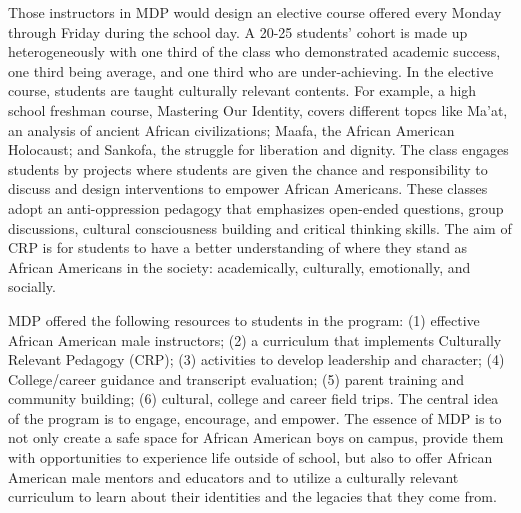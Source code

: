 Those instructors in MDP would design an elective course offered every Monday through Friday during the school day. A 20-25 students’ cohort is made up heterogeneously with one third of the class who demonstrated academic success, one third being average, and one third who are under-achieving. In the elective course, students are taught culturally relevant contents. For example, a high school freshman course, Mastering Our Identity, covers different topcs like Ma’at, an analysis of ancient African civilizations; Maafa, the African American Holocaust; and Sankofa, the struggle for liberation and dignity. The class engages students by projects where students are given the chance and responsibility to discuss and design interventions to empower African Americans. These classes adopt an anti-oppression pedagogy that emphasizes open-ended questions, group discussions, cultural consciousness building and critical thinking skills. The aim of CRP is for students to have a better understanding of where they stand as African Americans in the society: academically, culturally, emotionally, and socially.

MDP offered the following resources to students in the program: (1) effective African American male instructors; (2) a curriculum that implements Culturally Relevant Pedagogy (CRP); (3) activities to develop leadership and character; (4) College/career guidance and transcript evaluation; (5) parent training and community building; (6) cultural, college and career field trips. The central idea of the program is to engage, encourage, and empower. The essence of MDP is to not only create a safe space for African American boys on campus, provide them with opportunities to experience life outside of school, but also to offer African American male mentors and educators and to utilize a culturally relevant curriculum to learn about their identities and the legacies that they come from.